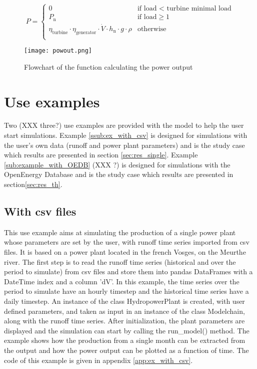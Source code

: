 \begin{equation}
  \label{eq_pow}
P= \left\{
    \begin{array}{ll}
	0 & \mbox{if load < turbine minimal load}\\
        P_\mathrm{n} & \mbox{if load}\geq 1 \\
        \eta_\mathrm{turbine} \cdot \eta_\mathrm{generator} \cdot \dot{V} \cdot h_\mathrm{n} \cdot g \cdot \rho & \mbox{otherwise}\\
    \end{array}
\right.
\end{equation}

\begin{figure}[H]
\centering
\texttt{[image: powout.png]}
\caption{Flowchart of the function calculating the power output}
\label{powout}
\end{figure}



\section{Use examples}
Two (XXX three?) use examples are provided with the model to help the user start simulations. Example \ref{ssub:ex_with_csv} is designed for simulations with the user's own data (runoff and power plant parameters) and is the study case which results are presented in section \ref{sec:res_single}. Example \ref{sub:example_with_OEDB} (XXX ?) is designed for simulations with the OpenEnergy Database and is the study case which results are presented in section\ref{sec:res_th}.

\subsection{With csv files}
\label{sub:ex_with_csv}

This use example aims at simulating the production of a single power plant whose parameters are set by the user, with runoff time series imported from csv files. It is based on a power plant located in the french Vosges, on the Meurthe river. \newline
The first step is to read the runoff time series (historical and over the period to simulate) from csv files and store them into pandas DataFrames with a DateTime index and a column 'dV'.
In this example, the time series over the period to simulate have an hourly timestep and the historical time series have a daily timestep. An instance of the class HydropowerPlant is created, with user defined parameters, and taken as input in an instance of the class Modelchain, along with the runoff time series. \newline
After initialization, the plant parameters are displayed and the simulation can start by calling the run{\_}model() method. The example shows how the production from a single month can be extracted from the output and how the power output can be plotted as a function of time. \newline
The code of this example is given in appendix \ref{app:ex_with_csv}.

